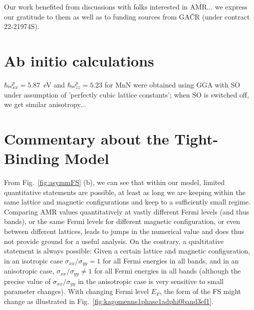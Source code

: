 \documentclass[prb,showpacs,amsmath,amssymb,superscriptaddress,twocolumn,floatfix]{revtex4-1}
\begin{document}
Our work benefited from discussions with folks interested in AMR...
we express our gratitude to them as well as to funding sources from GA\v{C}R (under contract 22-21974S).
 
\begin{appendix}

\section{Ab initio calculations}

$\hbar\omega^p_{xx}=5.87$~eV and $\hbar\omega^p_{zz}=5.23$ for MnN
were obtained using GGA with SO under assumption of 'perfectly cubic
lattice constants'; when SO is switched off, we get similar anisotropy...

\section{Commentary about the Tight-Binding Model}

From Fig.~\ref{fig:asymmFS} (b), we can see that within our model, limited quantitative statements are possible, at least as long we are keeping within the same lattice and magnetic configurations and keep to a sufficiently small regime. Comparing AMR values quantitatively at vastly different Fermi levels (and thus bands), or the same Fermi levels for different magnetic configuration, or even between different lattices, leads to jumps in the numerical value and does thus not provide ground for a useful analysis. On the contrary, a qualtitative statement is always possible: Given a certain lattice and magnetic configuration, in an isotropic case $\sigma_{xx} / \sigma_{yy} = 1$ for all Fermi energies in all bands, and in an anisotropic case, $\sigma_{xx} / \sigma_{yy} \neq 1$ for all Fermi energies in all bands (although the precise value of $\sigma_{xx} / \sigma_{yy}$ in the anisotropic case is very sensitive to small parameter changes). With changing Fermi level $E_F$, the form of the FS might change as illustrated in Fig.~\ref{fig:kagomenns1phase1adphi0band3ef1}.



\end{appendix}
\end{document}
